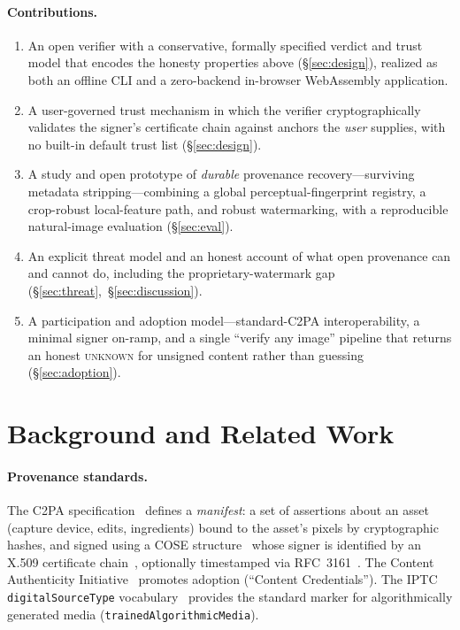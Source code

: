 \documentclass[11pt]{article}
\newcommand{\state}[1]{\textsc{#1}}
\begin{document}
\paragraph{Contributions.}
\begin{enumerate}[noitemsep]
\item An open verifier with a conservative, formally specified verdict and trust model that
encodes the honesty properties above (\S\ref{sec:design}), realized as both an offline CLI
and a zero-backend in-browser WebAssembly application.
\item A user-governed trust mechanism in which the verifier cryptographically validates the
signer's certificate chain against anchors the \emph{user} supplies, with no built-in
default trust list (\S\ref{sec:design}).
\item A study and open prototype of \emph{durable} provenance recovery---surviving metadata
stripping---combining a global perceptual-fingerprint registry, a crop-robust local-feature
path, and robust watermarking, with a reproducible natural-image evaluation
(\S\ref{sec:eval}).
\item An explicit threat model and an honest account of what open provenance can and cannot
do, including the proprietary-watermark gap (\S\ref{sec:threat},~\S\ref{sec:discussion}).
\item A participation and adoption model---standard-C2PA interoperability, a minimal signer
on-ramp, and a single ``verify any image'' pipeline that returns an honest \state{unknown}
for unsigned content rather than guessing (\S\ref{sec:adoption}).
\end{enumerate}

\section{Background and Related Work}
\paragraph{Provenance standards.} The C2PA specification~\cite{c2pa-spec} defines a
\emph{manifest}: a set of assertions about an asset (capture device, edits, ingredients)
bound to the asset's pixels by cryptographic hashes, and signed using a COSE
structure~\cite{rfc9052} whose signer is identified by an X.509 certificate
chain~\cite{rfc5280}, optionally timestamped via RFC~3161~\cite{rfc3161}. The Content
Authenticity Initiative~\cite{cai} promotes adoption (``Content Credentials''). The IPTC
\texttt{digitalSourceType} vocabulary~\cite{iptc-dst} provides the standard marker for
algorithmically generated media (\texttt{trainedAlgorithmicMedia}).
\end{document}
